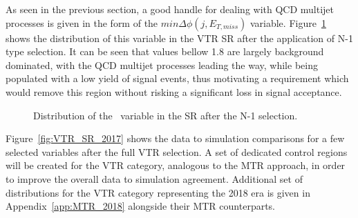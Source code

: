 \hspace{10pt} As seen in the previous section, a good handle for dealing with QCD multijet processes is given in the form of the $min\Delta\phi(j, E_{T,miss})$ variable. Figure~\ref{fig:VTR_mindphi} shows the distribution of this variable in the VTR SR after the application of N-1 type selection. It can be seen that values bellow 1.8 are largely background dominated, with the QCD multijet processes leading the way, while being populated with a low yield of signal events, thus motivating a requirement which would remove this region without risking a significant loss in signal acceptance. 

\begin{figure}[htbp]
  \centering
  \caption{Distribution of the \mindphi~variable in the SR after the N-1 selection.}
  \label{fig:VTR_mindphi}
\end{figure}
Figure~\ref{fig:VTR_SR_2017} shows the data to simulation comparisons for a few selected variables after the full VTR selection. A set of dedicated control regions will be created for the VTR category, analogous to the MTR approach, in order to improve the overall data to simulation agreement. Additional set of distributions for the VTR category representing the 2018 era is given in Appendix~\ref{app:MTR_2018} alongside their MTR counterparts. 






